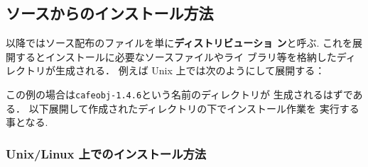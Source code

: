 \subsection{ソースからのインストール方法}
以降ではソース配布のファイルを単に\textbf{ディストリビューショ
  ン}と呼ぶ. これを展開するとインストールに必要なソースファイルやライ
ブラリ等を格納したディレクトリが生成される．
例えば Unix 上では次のようにして展開する： 
\begin{vvtm}
\begin{examplev}
\end{examplev}
\end{vvtm}
この例の場合は\verb|cafeobj-1.4.6|という名前のディレクトリが
生成されるはずである．
以下展開して作成されたディレクトリの下でインストール作業を
実行する事となる. 

\subsubsection{Unix/Linux 上でのインストール方法}


